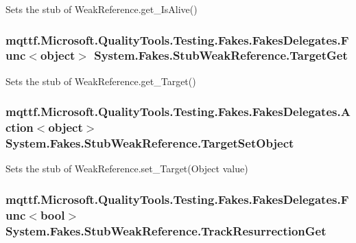 Sets the stub of Weak\-Reference.\-get\-\_\-\-Is\-Alive()

\hypertarget{class_system_1_1_fakes_1_1_stub_weak_reference_ac44d01b78c7e73d9684e47bd3570316e}{
\subsubsection[{Target\-Get}]{\setlength{\rightskip}{0pt plus 5cm}mqttf.\-Microsoft.\-Quality\-Tools.\-Testing.\-Fakes.\-Fakes\-Delegates.\-Func$<$object$>$ System.\-Fakes.\-Stub\-Weak\-Reference.\-Target\-Get}}\label{class_system_1_1_fakes_1_1_stub_weak_reference_ac44d01b78c7e73d9684e47bd3570316e}


Sets the stub of Weak\-Reference.\-get\-\_\-\-Target()

\hypertarget{class_system_1_1_fakes_1_1_stub_weak_reference_a7f3984e1d56d4263058554e4ebed427f}{
\subsubsection[{Target\-Set\-Object}]{\setlength{\rightskip}{0pt plus 5cm}mqttf.\-Microsoft.\-Quality\-Tools.\-Testing.\-Fakes.\-Fakes\-Delegates.\-Action$<$object$>$ System.\-Fakes.\-Stub\-Weak\-Reference.\-Target\-Set\-Object}}\label{class_system_1_1_fakes_1_1_stub_weak_reference_a7f3984e1d56d4263058554e4ebed427f}


Sets the stub of Weak\-Reference.\-set\-\_\-\-Target(\-Object value)

\hypertarget{class_system_1_1_fakes_1_1_stub_weak_reference_adebd0dd0848ef1e41390547dd3fbfa7d}{
\subsubsection[{Track\-Resurrection\-Get}]{\setlength{\rightskip}{0pt plus 5cm}mqttf.\-Microsoft.\-Quality\-Tools.\-Testing.\-Fakes.\-Fakes\-Delegates.\-Func$<$bool$>$ System.\-Fakes.\-Stub\-Weak\-Reference.\-Track\-Resurrection\-Get}}\label{class_system_1_1_fakes_1_1_stub_weak_reference_adebd0dd0848ef1e41390547dd3fbfa7d}


